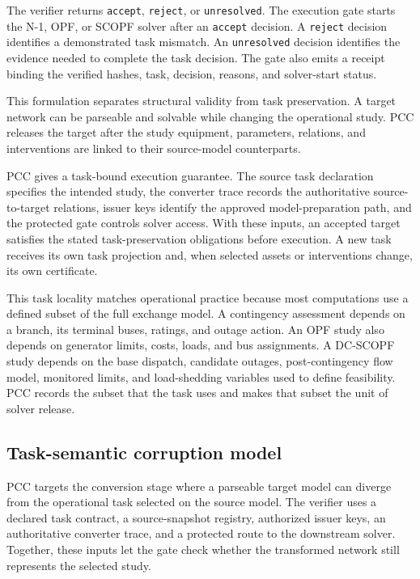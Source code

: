 \documentclass[preprint,12pt]{elsarticle}
\begin{document}
The verifier returns \texttt{accept}, \texttt{reject}, or \texttt{unresolved}. The execution gate starts the N-1, OPF, or SCOPF solver after an \texttt{accept} decision. A \texttt{reject} decision identifies a demonstrated task mismatch. An \texttt{unresolved} decision identifies the evidence needed to complete the task decision. The gate also emits a receipt binding the verified hashes, task, decision, reasons, and solver-start status.

This formulation separates structural validity from task preservation. A target network can be parseable and solvable while changing the operational study. PCC releases the target after the study equipment, parameters, relations, and interventions are linked to their source-model counterparts.

PCC gives a task-bound execution guarantee. The source task declaration specifies the intended study, the converter trace records the authoritative source-to-target relations, issuer keys identify the approved model-preparation path, and the protected gate controls solver access. With these inputs, an accepted target satisfies the stated task-preservation obligations before execution. A new task receives its own task projection and, when selected assets or interventions change, its own certificate.

This task locality matches operational practice because most computations use a defined subset of the full exchange model. A contingency assessment depends on a branch, its terminal buses, ratings, and outage action. An OPF study also depends on generator limits, costs, loads, and bus assignments. A DC-SCOPF study depends on the base dispatch, candidate outages, post-contingency flow model, monitored limits, and load-shedding variables used to define feasibility. PCC records the subset that the task uses and makes that subset the unit of solver release.

\subsection{Task-semantic corruption model}

PCC targets the conversion stage where a parseable target model can diverge from the operational task selected on the source model. The verifier uses a declared task contract, a source-snapshot registry, authorized issuer keys, an authoritative converter trace, and a protected route to the downstream solver. Together, these inputs let the gate check whether the transformed network still represents the selected study.
\end{document}
